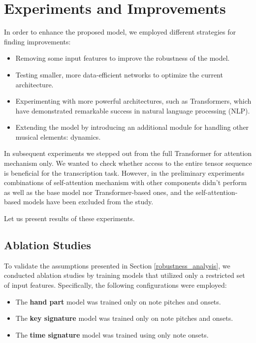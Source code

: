 \chapter{Experiments and Improvements}\label{experiments_and_improvements}

In order to enhance the proposed model, we employed different strategies for finding improvements: \begin{itemize}
	\item Removing some input features to improve the robustness of the model.
	\item Testing smaller, more data-efficient networks to optimize the current architecture.
	\item Experimenting with more powerful architectures, such as Transformers, which have demonstrated remarkable success in natural language processing (NLP).
	\item Extending the model by introducing an additional module for handling other musical elements: dynamics. \end{itemize}
	
In subsequent experiments we stepped out from the full Transformer for attention mechanism only. We wanted to check whether access to the entire tensor sequence is beneficial for the transcription task. However, in the preliminary experiments combinations of self-attention mechanism with other components didn't perform as well as the base model nor Transformer-based ones, and the self-attention-based models have been excluded from the study.
	
Let us present results of these experiments.

\section{Ablation Studies} \label{ablation_studies}

To validate the assumptions presented in Section \ref{robustness_analysis}, we conducted ablation studies by training models that utilized only a restricted set of input features. Specifically, the following configurations were employed: \begin{itemize}
	\item The \textbf{hand part} model was trained only on note pitches and onsets.
	\item The \textbf{key signature} model was trained only on note pitches and onsets.
	\item The \textbf{time signature} model was trained using only note onsets.
\end{itemize}

